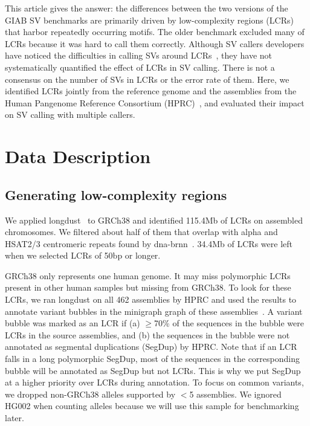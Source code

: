 \documentclass[a4paper,num-refs]{oup-contemporary}
\begin{document}
This article gives the answer:
the differences between the two versions of the GIAB SV benchmarks
are primarily driven by low-complexity regions (LCRs) that harbor repeatedly occurring motifs.
The older benchmark excluded many of LCRs because it was hard to call them correctly.
Although SV callers developers have noticed the difficulties in calling SVs around LCRs~\cite{Zook:2020aa,Smolka:2024ab,Keskus:2025aa},
they have not systematically quantified the effect of LCRs in SV calling.
There is not a consensus on the number of SVs in LCRs or the error rate of them.
Here, we identified LCRs jointly from the reference genome
and the assemblies from the Human Pangenome Reference Consortium (HPRC)~\cite{Liao:2023aa},
and evaluated their impact on SV calling with multiple callers.


\section{Data Description}

\subsection{Generating low-complexity regions}

We applied longdust~\cite{Li:2025aa} to GRCh38 and identified 115.4Mb of LCRs on assembled chromosomes.
We filtered about half of them that overlap with alpha and HSAT2/3 centromeric repeats found by dna-brnn~\cite{Li:2019aa}.
34.4Mb of LCRs were left when we selected LCRs of 50bp or longer.

GRCh38 only represents one human genome.
It may miss polymorphic LCRs present in other human samples but missing from GRCh38.
To look for these LCRs, we ran longdust on all 462 assemblies by HPRC
and used the results to annotate variant bubbles in the minigraph graph of these assemblies~\cite{Li:2020aa}.
A variant bubble was marked as an LCR if (a) $\ge$70\% of the sequences in the bubble were LCRs in the source assemblies, and
(b) the sequences in the bubble were not annotated as segmental duplications (SegDup) by HPRC.
Note that if an LCR falls in a long polymorphic SegDup, most of the sequences in the corresponding bubble will be annotated as SegDup but not LCRs.
This is why we put SegDup at a higher priority over LCRs during annotation.
To focus on common variants, we dropped non-GRCh38 alleles supported by $<$5 assemblies.
We ignored HG002 when counting alleles because we will use this sample for benchmarking later.
\end{document}
